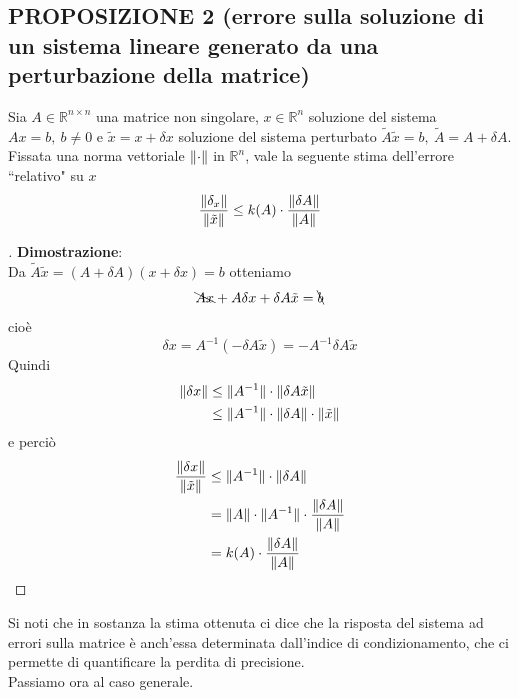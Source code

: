 \documentclass[12pt,a4paper]{article}
\DeclarePairedDelimiter{\norma}{\lVert}{\rVert}
\begin{document}
\subsection{PROPOSIZIONE 2 (errore sulla soluzione di un sistema lineare generato da una perturbazione della matrice)}
Sia $A \in \mathbb{R}^{n \times n}$ una matrice non singolare, $x \in \mathbb{R}^n$ soluzione del sistema $Ax = b, \ b \neq 0$ e $\tilde{x} = x + \delta x$ soluzione del sistema perturbato $\tilde{A} \tilde{x} = b, \ \tilde{A} = A + \delta A$.\\
Fissata una norma vettoriale $\norma{\cdot}$ in $\mathbb{R}^n$, vale la seguente stima dell'errore ``relativo" su $x$
\[
\frac{\norma{\delta_x}}{\norma{\tilde{x}}} \le k(A) \cdot \frac{\norma{\delta A}}{\norma{A}}
\]
\begin{proof}[\unskip\nopunct]
\textbf{Dimostrazione}:\\
Da $\tilde{A} \tilde{x} = (A + \delta A)(x + \delta x) = b$ otteniamo
\[
\bcancel{Ax} + A\delta x + \delta A \tilde{x} = \bcancel{b}
\]
cioè
\[
\delta x = A^{-1} (-\delta A \tilde{x}) = -A^{-1} \delta A\tilde{x}
\]
Quindi
\begin{align*}
    \norma{\delta x} &\le \norma{A^{-1}} \cdot \norma{\delta A \tilde{x}} \\
    & \le \norma{A^{-1}} \cdot \norma{\delta A} \cdot \norma{\tilde{x}}
\end{align*}
e perciò
\begin{align*}
    \frac{\norma{\delta x}}{\norma{\tilde{x}}} &\le \norma{A^{-1}} \cdot \norma{\delta A} \\
    & = \norma{A} \cdot \norma{A^{-1}} \cdot \frac{\norma{\delta A}}{\norma{A}} \\
    & = k(A) \cdot \frac{\norma{\delta A}}{\norma{A}}
\end{align*}
\end{proof}
Si noti che in sostanza la stima ottenuta ci dice che la risposta del sistema ad errori sulla matrice è anch'essa determinata dall'indice di condizionamento, che ci permette di quantificare la perdita di precisione.\\
Passiamo ora al caso generale.\\
\end{document}
